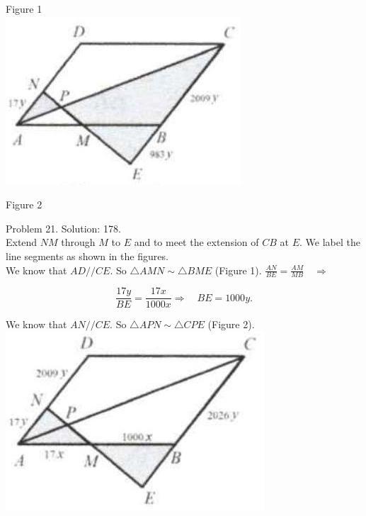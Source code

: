 \documentclass[10pt]{article}
\begin{document}
Figure 1\\
\includegraphics[max width=\textwidth, center]{2025_04_17_97bc1f7e44d93c271a88g-142(4)}

Figure 2

Problem 21. Solution: 178.\\
Extend \(N M\) through \(M\) to \(E\) and to meet the extension of \(C B\) at \(E\). We label the line segments as shown in the figures.\\
We know that \(A D / / C E\). So \(\triangle A M N \sim \triangle B M E\) (Figure 1). \(\frac{A N}{B E}=\frac{A M}{M B} \quad \Rightarrow\)

\[
\frac{17 y}{B E}=\frac{17 x}{1000 x} \Rightarrow \quad B E=1000 y .
\]

We know that \(A N / / C E\). So \(\triangle A P N \sim \triangle C P E\) (Figure 2).\\
\includegraphics[max width=\textwidth, center]{2025_04_17_97bc1f7e44d93c271a88g-142(3)}
\end{document}
